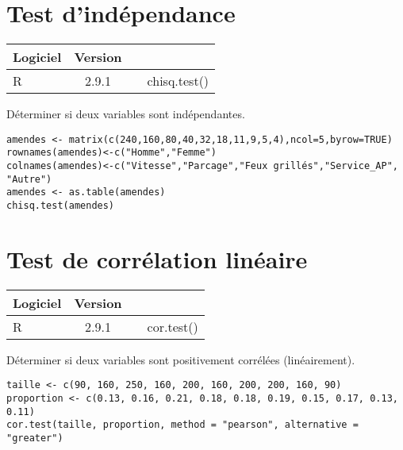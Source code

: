 %
%

\section{Test d'ind\'ependance}
\begin{tabular}{lc|l@{ = }l}
	Logiciel & Version \\
	\hline
	R & 2.9.1 &  & chisq.test()
\end{tabular}

\begin{ex}
D\'eterminer si deux variables sont ind\'ependantes.

\begin{verbatim}
amendes <- matrix(c(240,160,80,40,32,18,11,9,5,4),ncol=5,byrow=TRUE)
rownames(amendes)<-c("Homme","Femme")
colnames(amendes)<-c("Vitesse","Parcage","Feux grillés","Service_AP", "Autre")
amendes <- as.table(amendes)
chisq.test(amendes)
\end{verbatim}
\end{ex}

\section{Test de corr\'elation lin\'eaire}
\begin{tabular}{lc|l@{ = }l}
	Logiciel & Version \\
	\hline
	R & 2.9.1 &  & cor.test()
\end{tabular}

\begin{ex}
D\'eterminer si deux variables sont positivement corr\'el\'ees (lin\'eairement).

\begin{verbatim}
taille <- c(90, 160, 250, 160, 200, 160, 200, 200, 160, 90)
proportion <- c(0.13, 0.16, 0.21, 0.18, 0.18, 0.19, 0.15, 0.17, 0.13, 0.11)
cor.test(taille, proportion, method = "pearson", alternative = "greater")
\end{verbatim}
\end{ex}

